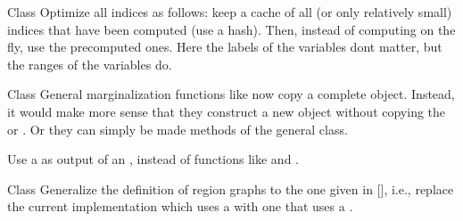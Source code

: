 \begin{DoxyRefList}
\item[Class \doxylink{classdai_1_1IndexFor}{dai\+::Index\+For} ]\label{ideas__ideas000012}%
%
 Optimize all indices as follows\+: keep a cache of all (or only relatively small) indices that have been computed (use a hash). Then, instead of computing on the fly, use the precomputed ones. Here the labels of the variables don\textquotesingle{}t matter, but the ranges of the variables do.  
\item[Class \doxylink{classdai_1_1InfAlg}{dai\+::Inf\+Alg} ]\label{ideas__ideas000004}%
%
 General marginalization functions like  now copy a complete  object. Instead, it would make more sense that they construct a new object without copying the  or . Or they can simply be made methods of the general  class. 



Use a  as output of an , instead of functions like  and .  
\item[Class \doxylink{classdai_1_1RegionGraph}{dai\+::Region\+Graph} ]\label{ideas__ideas000014}%
%
 Generalize the definition of region graphs to the one given in \mbox{[}\mbox{]}, i.\+e., replace the current implementation which uses a  with one that uses a . 




\end{DoxyRefList}
